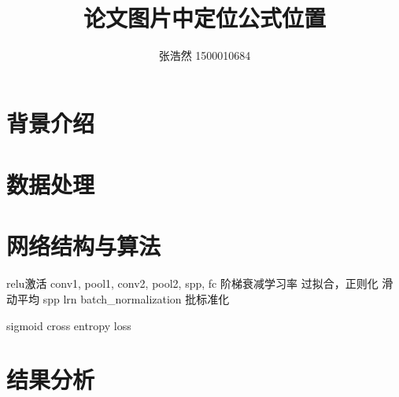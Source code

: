 \documentclass{article}
\title{论文图片中定位公式位置}
\author{张浩然 1500010684}
\date{}
\begin{document}


\maketitle
\tableofcontents

\abstract{}

\newpage

\section{背景介绍}



\section{数据处理}

\section{网络结构与算法}

relu激活
conv1, pool1, conv2, pool2, spp, fc
阶梯衰减学习率
过拟合，正则化
滑动平均
spp
lrn
batch\_normalization 批标准化

sigmoid cross entropy loss


\cite{name1}

\section{结果分析}




\end{document}
